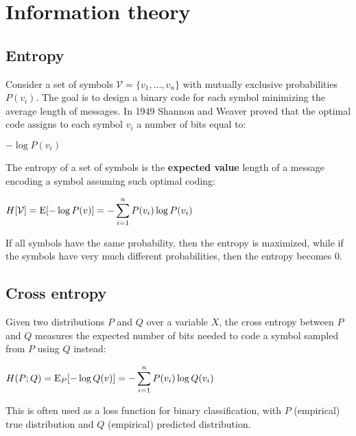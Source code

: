 \section{Information theory}
%
%
\subsection{Entropy}
Consider a set of symbols $\mathcal{V}=\{v_1,\hdots,v_n\}$ with mutually exclusive probabilities $P(v_i)$. \newline
The goal is to design a binary code for each symbol minimizing the average length of messages. In 1949 Shannon and Weaver proved that the optimal code assigns to each symbol $v_i$ a number of bits equal to:
\begin{center}
	$\displaystyle -\log{P(v_i)}$
\end{center}
\begin{definition}[Entropy]
The entropy of a set of symbols is the \textbf{expected value} length of a message encoding a symbol assuming such optimal coding:
\begin{center}
	$\displaystyle H[\mathcal{V}]=\text{E}[-\log{P(v)}]=-\displaystyle\sum_{i=1}^nP(v_i)\log{P(v_i)}$
\end{center}
\end{definition}
If all symbols have the same probability, then the entropy is maximized, while if the symbols have very much different probabilities, then the entropy becomes 0. \newline
%
%
\subsection{Cross entropy}
\begin{definition}
Given two distributions $P$ and $Q$ over a variable $X$, the cross entropy between $P$ and $Q$ measures the expected number of bits needed to code a symbol sampled from $P$ using $Q$ instead:
\begin{center}
	$\displaystyle H(P;Q)=\text{E}_P[-\log{Q(v)}]=-\displaystyle\sum_{i=1}^nP(v_i)\log{Q(v_i)}$
\end{center}
\end{definition}
This is often used as a loss function for binary classification, with $P$ (empirical) true distribution and $Q$ (empirical) predicted distribution. 
%
%
